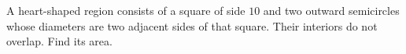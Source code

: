 A heart-shaped region consists of a square of side $10$ and two outward semicircles whose diameters are two adjacent sides of that square. Their interiors do not overlap. Find its area.
